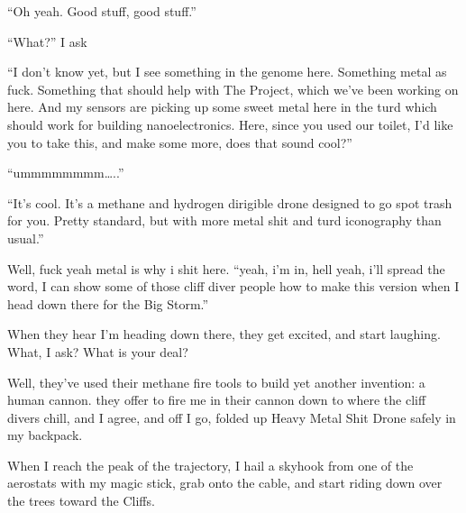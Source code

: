 ``Oh yeah. Good stuff, good stuff.''

``What?'' I ask

``I don't know yet, but I see something in the genome here. Something
metal as fuck. Something that should help with The Project, which we've
been working on here. And my sensors are picking up some sweet metal
here in the turd which should work for building nanoelectronics. Here,
since you used our toilet, I'd like you to take this, and make some
more, does that sound cool?''

``ummmmmmmm\ldots{}..''

``It's cool. It's a methane and hydrogen dirigible drone designed to go
spot trash for you. Pretty standard, but with more metal shit and turd
iconography than usual.''

Well, fuck yeah metal is why i shit here. ``yeah, i'm in, hell yeah,
i'll spread the word, I can show some of those cliff diver people how to
make this version when I head down there for the Big Storm.''

When they hear I'm heading down there, they get excited, and start
laughing. What, I ask? What is your deal?

Well, they've used their methane fire tools to build yet another
invention: a human cannon. they offer to fire me in their cannon down to
where the cliff divers chill, and I agree, and off I go, folded up Heavy
Metal Shit Drone safely in my backpack.

When I reach the peak of the trajectory, I hail a skyhook from one of
the aerostats with my magic stick, grab onto the cable, and start riding
down over the trees toward the Cliffs.
